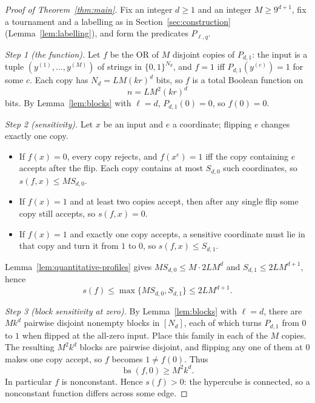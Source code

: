 \documentclass[11pt]{article}
\newcommand{\bs}{\operatorname{bs}}
\theoremstyle{definition}
\theoremstyle{remark}
\begin{document}
\begin{proof}[Proof of Theorem~\ref{thm:main}]
Fix an integer \(d\geq1\) and an integer \(M\geq9^{d+1}\), fix a tournament
and a labelling as in Section~\ref{sec:construction}
(Lemma~\ref{lem:labelling}), and form the predicates \(P_{\ell,q}\).

\emph{Step 1 (the function).} Let \(f\) be the OR of \(M\) disjoint copies of
\(P_{d,1}\): the input is a tuple \((y^{(1)},\ldots,y^{(M)})\) of strings in
\(\{0,1\}^{N_d}\), and \(f=1\) iff \(P_{d,1}(y^{(c)})=1\) for some \(c\). Each
copy has \(N_d=LM(kr)^d\) bits, so \(f\) is a total Boolean function on
\begin{equation}
\label{eq:final-dimension}
 n=LM^2(kr)^d
\end{equation}
bits. By Lemma~\ref{lem:blocks} with \(\ell=d\), \(P_{d,1}(0)=0\), so
\(f(0)=0\).

\emph{Step 2 (sensitivity).} Let \(x\) be an input and \(e\) a coordinate;
flipping \(e\) changes exactly one copy.
\begin{itemize}[nosep]
\item If \(f(x)=0\), every copy rejects, and \(f(x^e)=1\) iff the copy
 containing \(e\) accepts after the flip. Each copy contains at most
 \(S_{d,0}\) such coordinates, so \(s(f,x)\le MS_{d,0}\).
\item If \(f(x)=1\) and at least two copies accept, then after any single
 flip some copy still accepts, so \(s(f,x)=0\).
\item If \(f(x)=1\) and exactly one copy accepts, a sensitive coordinate
 must lie in that copy and turn it from \(1\) to \(0\), so
 \(s(f,x)\le S_{d,1}\).
\end{itemize}
Lemma~\ref{lem:quantitative-profiles} gives \(MS_{d,0}\le M\cdot2LM^{d}\) and
\(S_{d,1}\le 2LM^{d+1}\), hence
\begin{equation}
\label{eq:final-sensitivity}
 s(f)\leq\max\{M S_{d,0},S_{d,1}\}
       \leq2L M^{d+1}.
\end{equation}

\emph{Step 3 (block sensitivity at zero).} By Lemma~\ref{lem:blocks} with
\(\ell=d\), there are \(Mk^d\) pairwise disjoint nonempty blocks in
\([N_d]\), each of which turns \(P_{d,1}\) from \(0\) to \(1\) when flipped
at the all-zero input. Place this family in each of the \(M\) copies. The
resulting \(M^2k^d\) blocks are pairwise disjoint, and flipping any one of
them at \(0\) makes one copy accept, so \(f\) becomes \(1\ne f(0)\). Thus
\begin{equation}
\label{eq:final-block-sensitivity}
 \bs(f,0)\geq M^2k^d .
\end{equation}
In particular \(f\) is nonconstant. Hence \(s(f)>0\): the hypercube is
connected, so a nonconstant function differs across some edge.


\end{proof}
\end{document}
